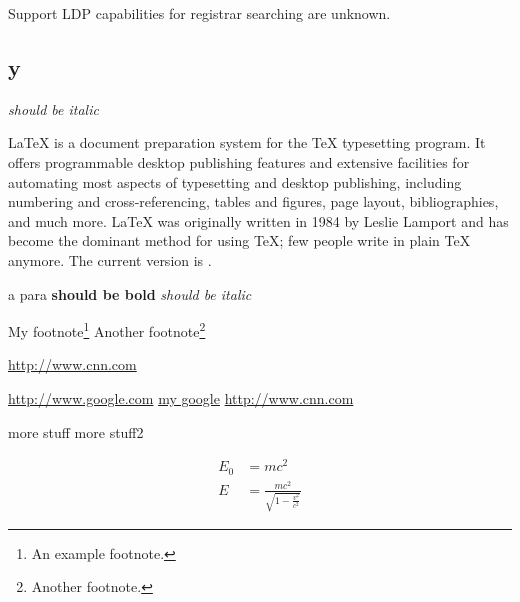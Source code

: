\documentclass[10pt,a4paper]{article}
\begin{document}
\begin{flushleft}
% 
% 
% 
% 

Support LDP capabilities for registrar searching are unknown.



\subsection{y}






  \end{flushleft}


  \textit{should be italic}


\LaTeX{} is a document preparation system for the \TeX{}
  typesetting program. It offers programmable desktop
  publishing features and extensive facilities for
  automating most aspects of typesetting and desktop
  publishing, including numbering and cross-referencing,
  tables and figures, page layout, bibliographies, and
  much more. \LaTeX{} was originally written in 1984 by
  Leslie Lamport and has become the dominant method for
  using \TeX; few people write in plain \TeX{} anymore.
  The current version is \LaTeXe.

  \begin{flushright}
  a para
  \textbf{should be bold}
  \textit{should be italic}

  \end{flushright}



  \begin{flushleft}
  My footnote\footnote{An example footnote.}
  Another footnote\footnote{Another footnote.}

  \hyperref[cnn]{http://www.cnn.com}

  \url{http://www.google.com}
  \href{http://www.google.com}{my google}
  \href{http://www.cnn.com}{http://www.cnn.com}

  \end{flushleft}
  more stuff
  more stuff2

  \begin{align}
    E_0 &= mc^2                              \\
    E &= \frac{mc^2}{\sqrt{1-\frac{v^2}{c^2}}}
  \end{align}
\end{document}
